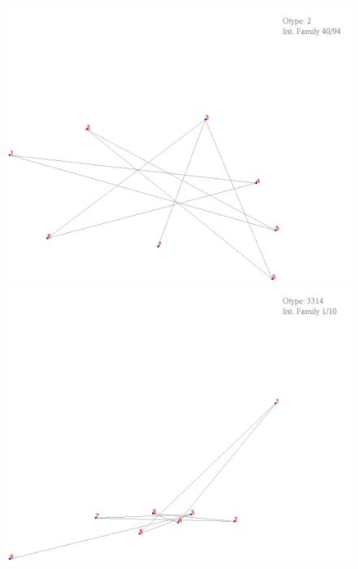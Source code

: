 \documentclass[11pt,epsf,times,letterpaper]{article}
\begin{document}
	\begin{figure}
		\includegraphics[scale=.4]{if_tam0_tam1/3.png}
		\includegraphics[scale=.4]{if_tam0_tam1/4.png}
	\end{figure}
	
\end{document}
